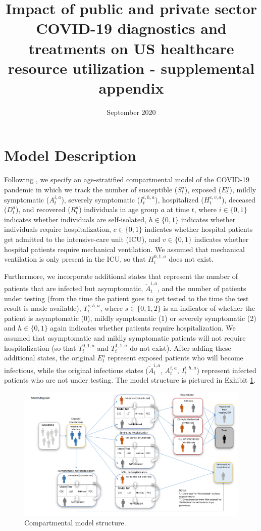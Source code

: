 \documentclass{article}
\title{Impact of public and private sector COVID-19 diagnostics and treatments on US healthcare resource utilization - supplemental appendix}
\date{September 2020}
\begin{document}
\maketitle

\section{Model Description \label{sec:model}}

Following \citet{moghadasCOVID}, we specify an age-stratified compartmental model of the COVID-19 pandemic in which we track the number of susceptible ($S^a_t$), exposed ($E^a_t$), mildly symptomatic ($A^{i,a}_t$), severely symptomatic ($I^{i,h,a}_t$), hospitalized ($H^{c,v,a}_t$), deceased ($D^a_t$), and recovered ($R^a_t$) individuals in age group $a$ at time $t$, where $i \in \{0,1\}$ indicates whether individuals are self-isolated, $h \in \{0,1\}$ indicates whether individuals require hospitalization, $c \in \{0,1\}$ indicates whether hospital patients get admitted to the intensive-care unit (ICU), and $v \in \{0,1\}$ indicates whether hospital patients require mechanical ventilation. We assumed that mechanical ventilation is only present in the ICU, so that $H^{0,1,a}_t$ does not exist.

Furthermore, we incorporate additional states that represent the number of patients that are infected but asymptomatic, $\tilde{A}^{i,a}_t$, and the number of patients under testing (from the time the patient goes to get tested to the time the test result is made available), $T^{s,h,a}_t$, where $s \in \{0,1,2\}$ is an indicator of whether the patient is asymptomatic (0), mildly symptomatic (1) or severely symptomatic (2) and $h \in \{0,1\}$ again indicates whether patients require hospitalization. We assumed that asymptomatic and mildly symptomatic patients will not require hospitalization (so that $T^{0,1,a}_t$ and $T^{1,1,a}_t$ do not exist). After adding these additional states, the original $E^a_t$ represent exposed patients who will become infectious, while the original infectious states ($\tilde{A}^{i,a}_t$, $A^{i,a}_t$, $I^{i,h,a}_t$) represent infected patients who are not under testing. The model structure is pictured in Exhibit \ref{fig:model}.

\begin{figure}[hbt!]
\centering
\includegraphics[width=1.0\textwidth]{figures/Figure1}
\caption{Compartmental model structure.} \label{fig:model}
\end{figure}
\end{document}
